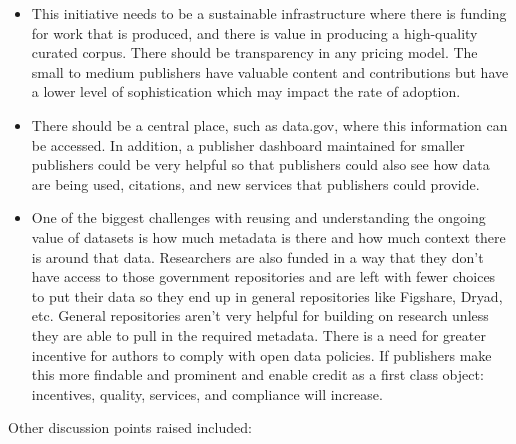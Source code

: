 \documentclass[titlepage, 11pt]{article}
\begin{document}
{\begin{itemize}
    \item This initiative needs to be a sustainable infrastructure where there is funding for work that is produced, and there is value in producing a high-quality curated corpus. There should be transparency in any pricing model. The small to medium publishers have valuable content and contributions but have a lower level of sophistication which may impact the rate of adoption.
    \item There should be a central place, such as data.gov, where this information can be accessed. In addition, a publisher dashboard maintained for smaller publishers could be very helpful so that publishers could also see how data are being used, citations, and new services that publishers could provide.
    \item One of the biggest challenges with reusing and understanding the ongoing value of datasets is how much metadata is there and how much context there is around that data. Researchers are also funded in a way that they don’t have access to those government repositories and are left with fewer choices to put their data so they end up in general repositories like Figshare, Dryad, etc. General repositories aren’t very helpful for building on research unless they are able to pull in the required metadata. There is a need for greater incentive for authors to comply with open data policies.  If publishers make this more findable and prominent and enable credit as a first class object: incentives, quality, services, and compliance will increase. 
\end{itemize}

Other discussion points raised included: 

}
\end{document}
